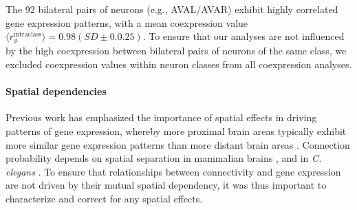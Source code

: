 \documentclass[10pt,letterpaper]{article}
\begin{document}
The 92 bilateral pairs of neurons (e.g., AVAL/AVAR) exhibit highly correlated gene expression patterns, with a mean coexpression value $\langle r_\phi^{\mathrm{intraclass}} \rangle = 0.98 (SD\pm0.0.25)$.
To ensure that our analyses are not influenced by the high coexpression between bilateral pairs of neurons of the same class, we excluded coexpression values within neuron classes from all coexpression analyses.

\paragraph{Spatial dependencies}
Previous work has emphasized the importance of spatial effects in driving patterns of gene expression, whereby more proximal brain areas typically exhibit more similar gene expression patterns than more distant brain areas \cite{Krienen2016, Fulcher:2016ck, Pantazatos:2016ir, Richiardi:2017hb}.
Connection probability depends on spatial separation in mammalian brains \cite{Henderson:2014fg, Horvat:2016ia, Wang:2016gg, Markov:2013jo}, and in \emph{C. elegans} \cite{Azulay:2016cg}.
To ensure that relationships between connectivity and gene expression are not driven by their mutual spatial dependency, it was thus important to characterize and correct for any spatial effects.
\end{document}
